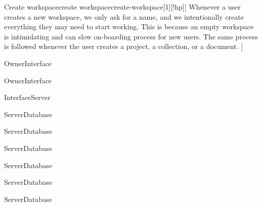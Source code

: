 \begin{sdfig}{Create workspace}{create workspace}{create-workspace}[1][!hp][
    Whenever a user creates a new workspace, we only ask for a name, and we intentionally create everything they may need to start working.
    This is because an empty workspace is intimidating and can slow on-boarding process for new users.
    The same process is followed whenever the user creates a project, a collection, or a document.
  ]

  \begin{seqdigauth}[Owner]
    \begin{umlcall}[op={Create workspace},return={Redirect to workspace creation}]{Owner}{Interface}
    \end{umlcall}
    \begin{umlcall}[op={Submit name}]{Owner}{Interface}
      \begin{umlcall}[op={Create workspace},return=Ok]{Interface}{Server}
        \begin{umlcall}[op={Create project}]{Server}{Database}
        \end{umlcall}
        \begin{umlcall}[op={Create collection}]{Server}{Database}
        \end{umlcall}
        \begin{umlcall}[op={Create field}]{Server}{Database}
        \end{umlcall}
        \begin{umlcall}[op={Create view}]{Server}{Database}
        \end{umlcall}
        \begin{umlcall}[op={Create document}]{Server}{Database}
        \end{umlcall}
        \begin{umlcall}[op={Create block}]{Server}{Database}
        \end{umlcall}
      \end{umlcall}
    \end{umlcall}
  \end{seqdigauth}
\end{sdfig}


